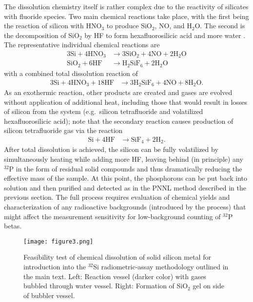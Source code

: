 \documentclass[final,5p]{elsarticle}
\def\si{$^{32}$Si\xspace}
\def\p{$^{32}$P\xspace}
\begin{document}
The dissolution chemistry itself is rather complex due to the reactivity of silicates with fluoride species. Two main chemical reactions take place, with the first being the reaction of silicon with HNO$_3$ to produce SiO$_2$, NO, and H$_2$O. The second is the decomposition of SiO$_2$ by HF to form hexafluorosilicic acid and more water \cite{steinert, schwartz}. The representative individual chemical reactions are
\begin{align}
3\textrm{Si} + 4\textrm{HNO}_{3} & \rightarrow 3\textrm{SiO}_{2} + 4\textrm{NO} + 2\textrm{H}_{2}\textrm{O} \\
\textrm{SiO}_{2} + 6\textrm{HF} & \rightarrow \textrm{H}_{2}\textrm{SiF}_{6} + 2\textrm{H}_{2}\textrm{O}
\label{eq:1}
\end{align}
with a combined total dissolution reaction of
\begin{align}
3\textrm{Si} + 4\textrm{HNO}_{3}+ 18\textrm{HF} & \rightarrow 3\textrm{H}_{2}\textrm{SiF}_{6} + 4\textrm{NO} + 8\textrm{H}_{2}\textrm{O}.
\label{eq:2}
\end{align}
As an exothermic reaction, other products are created and gases are evolved without application of additional heat, including those that would result in losses of silicon from the system (e.g.\ silicon tetrafluoride and volatilized hexafluorosilicic acid); note that the secondary reaction causes production of silicon tetrafluoride gas via the reaction
\begin{align}
\textrm{Si} + 4\textrm{HF} & \rightarrow  \textrm{SiF}_{4} + 2\textrm{H}_{2}.
\label{eq:3}
\end{align}
After total dissolution is achieved, the silicon can be fully volatilized by simultaneously heating while adding more HF, leaving behind (in principle) any \p in the form of residual solid compounds and thus dramatically reducing the effective mass of the sample.  At this point, the phosphorous can be put back into solution and then purified and detected as in the PNNL method described in the previous section. The full process requires evaluation of chemical yields and characterization of any radioactive backgrounds (introduced by the process) that might affect the measurement sensitivity for low-background counting of \p betas.

\begin{figure*}[ht]
\centering
\texttt{[image: figure3.png]}
\caption{\small Feasibility test of chemical dissolution of solid silicon metal for introduction into the \si radiometric-assay methodology outlined in the main text. Left: Reaction vessel (darker color) with gases bubbled through water vessel. Right: Formation of SiO$_2$ gel on side of bubbler vessel.} 
\label{fig:dissolution}
\end{figure*}
\end{document}
